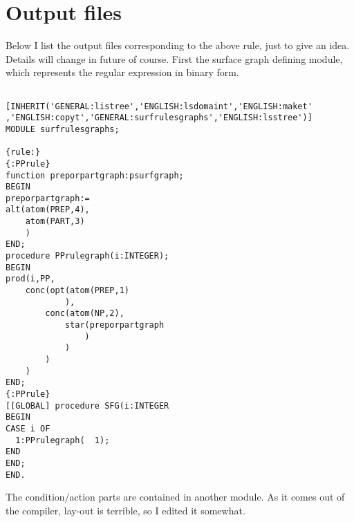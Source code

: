 \section{Output files}
Below I list the output files corresponding to the above rule, just to give an
idea. Details will change in future of course. First the surface graph
defining module, which represents the regular expression in binary form.
\begin{verbatim}

[INHERIT('GENERAL:listree','ENGLISH:lsdomaint','ENGLISH:maket'
,'ENGLISH:copyt','GENERAL:surfrulesgraphs','ENGLISH:lsstree')]
MODULE surfrulesgraphs;

{rule:}
{:PPrule}
function preporpartgraph:psurfgraph;
BEGIN
preporpartgraph:=
alt(atom(PREP,4),
    atom(PART,3)
    )
END;
procedure PPrulegraph(i:INTEGER);
BEGIN
prod(i,PP,
    conc(opt(atom(PREP,1)
            ),
        conc(atom(NP,2),
            star(preporpartgraph
                )
            )
        )
    )
END;
{:PPrule}
[[GLOBAL] procedure SFG(i:INTEGER
BEGIN
CASE i OF
  1:PPrulegraph(  1);
END
END;
END.

\end{verbatim}
The condition/action parts are contained in another module. As it comes out
of the compiler, lay-out is terrible, so I edited it somewhat.
